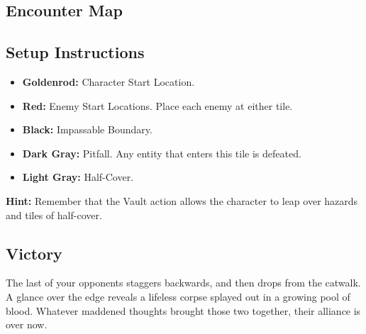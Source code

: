 \subsection*{Encounter Map}
\begin{center}
\end{center}

\subsection*{Setup Instructions}
\begin{itemize}
\item \textbf{Goldenrod:} Character Start Location.
\item \textbf{Red:} Enemy Start Locations. Place each enemy at either tile.
\item \textbf{Black:} Impassable Boundary.
\item \textbf{Dark Gray:} Pitfall. Any entity that enters this tile is defeated.
\item \textbf{Light Gray:} Half-Cover.
\end{itemize}

\begin{tcolorbox}
\textbf{Hint:} Remember that the Vault action allows the character to leap over hazards and tiles of half-cover.
\end{tcolorbox}

\pagebreak

\subsection*{Victory}
The last of your opponents staggers backwards, and then drops from the catwalk. A glance over the edge reveals a lifeless corpse splayed out in a growing pool of blood. Whatever maddened thoughts brought those two together, their alliance is over now.\\

